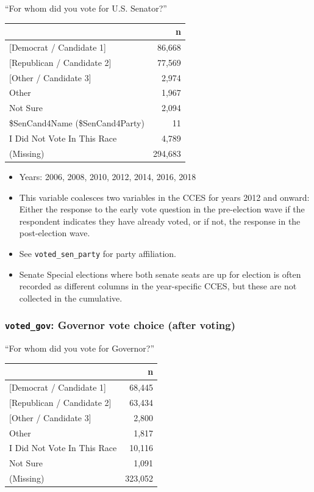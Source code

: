 \documentclass[10pt,article,oneside]{memoir}
\theoremstyle{definition}
\begin{document}
``For whom did you vote for U.S. Senator?''

\begin{table}[H]
\centering
\begin{tabular}{lr}
\toprule
 & n\\
\midrule
{[Democrat / Candidate 1]} & 86,668\\
{[Republican / Candidate 2]} & 77,569\\
{[Other / Candidate 3]} & 2,974\\
Other & 1,967\\
Not Sure & 2,094\\
\$SenCand4Name (\$SenCand4Party) & 11\\
I Did Not Vote In This Race & 4,789\\
(Missing) & 294,683\\
\bottomrule
\end{tabular}
\end{table}

\begin{itemize}
\tightlist
\item
  Years: 2006, 2008, 2010, 2012, 2014, 2016, 2018
\item
  This variable coalesces two variables in the CCES for years 2012 and
  onward: Either the response to the early vote question in the
  pre-election wave if the respondent indicates they have already voted,
  or if not, the response in the post-election wave.
\item
  See \texttt{voted\_sen\_party} for party affiliation.
\item
  Senate Special elections where both senate seats are up for election
  is often recorded as different columns in the year-specific CCES, but
  these are not collected in the cumulative.
\end{itemize}

\hypertarget{voted_gov-governor-vote-choice-after-voting}{%
\subsubsection{\texorpdfstring{\texttt{voted\_gov}: Governor vote choice
(after
voting)}{voted\_gov: Governor vote choice (after voting)}}\label{voted_gov-governor-vote-choice-after-voting}}

``For whom did you vote for Governor?''

\begin{table}[H]
\centering
\begin{tabular}{lr}
\toprule
 & n\\
\midrule
{[Democrat / Candidate 1]} & 68,445\\
{[Republican / Candidate 2]} & 63,434\\
{[Other / Candidate 3]} & 2,800\\
Other & 1,817\\
I Did Not Vote In This Race & 10,116\\
Not Sure & 1,091\\
(Missing) & 323,052\\
\bottomrule
\end{tabular}
\end{table}
\end{document}
